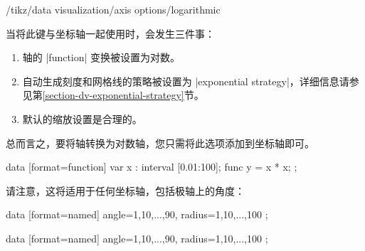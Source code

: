 \begin{key}{/tikz/data visualization/axis options/logarithmic}

    当将此键与坐标轴一起使用时，会发生三件事：
    \begin{enumerate}
        \item 轴的 |function| 变换被设置为对数。
        \item 自动生成刻度和网格线的策略被设置为 |exponential strategy|，详细信息请参见第\ref{section-dv-exponential-strategy}节。
        \item 默认的缩放设置是合理的。
    \end{enumerate}
    总而言之，要将轴转换为对数轴，您只需将此选项添加到坐标轴即可。
\begin{codeexample}[
    width=8cm,
    preamble={\usetikzlibrary{datavisualization.formats.functions}},
]
\tikz \datavisualization [scientific axes,
                          x axis={logarithmic},
                          y axis={logarithmic},
                          visualize as line]
 data [format=function] {
   var x : interval [0.01:100];
   func y = \value x * \value x;
 };
\end{codeexample}
    请注意，这将适用于任何坐标轴，包括极轴上的角度：
\begin{codeexample}[preamble={\usetikzlibrary{datavisualization.polar}}]
\tikz \datavisualization
    [new polar axes,
     angle axis={logarithmic, scaling=1 at 0 and 90 at 90},
     radius axis={scaling=0 at 0cm and 100 at 3cm},
     visualize as scatter]
  data [format=named] {
    angle={1,10,...,90}, radius={1,10,...,100}
  };
\end{codeexample}
\begin{codeexample}[preamble={\usetikzlibrary{datavisualization.polar}}]
\tikz \datavisualization
    [new polar axes,
     angle axis={degrees},
     radius axis={logarithmic, scaling=1 at 0cm and 100 at 3cm},
     visualize as scatter]
  data [format=named] {
    angle={1,10,...,90}, radius={1,10,...,100}
  };
\end{codeexample}
\end{key}


